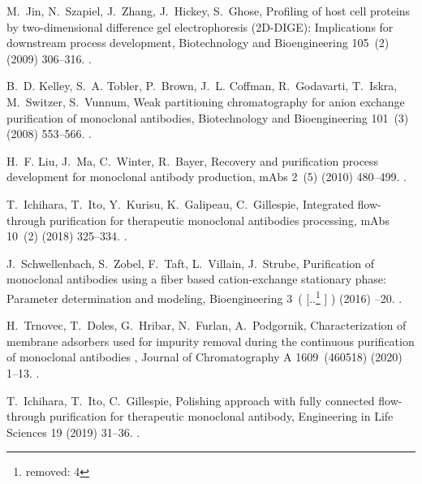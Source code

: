 \documentclass[preprint,review,12pt]{elsarticle}
\providecommand{\DIFaddtex}[1]{{\protect\color{blue} \sf #1}} %
\providecommand{\DIFdeltex}[1]{{\protect\color{red} [..\footnote{removed: #1} ]}} %
\providecommand{\DIFaddbegin}{} %
\providecommand{\DIFaddend}{} %
\providecommand{\DIFdelbegin}{} %
\providecommand{\DIFdelend}{} %
\providecommand{\DIFadd}[1]{\texorpdfstring{\DIFaddtex{#1}}{#1}} %
\providecommand{\DIFdel}[1]{\texorpdfstring{\DIFdeltex{#1}}{}} %
\begin{document}
\begin{thebibliography}{10}
M.~Jin, N.~Szapiel, J.~Zhang, J.~Hickey, S.~Ghose, {Profiling of host cell
  proteins by two-dimensional difference gel electrophoresis (2D-DIGE):
  Implications for downstream process development}, Biotechnology and
  Bioengineering 105~(2) (2009) 306--316.
\newblock \href {https://doi.org/10.1002/bit.22532}
  {}.

B.~D. Kelley, S.~A. Tobler, P.~Brown, J.~L. Coffman, R.~Godavarti, T.~Iskra,
  M.~Switzer, S.~Vunnum, {Weak partitioning chromatography for anion exchange
  purification of monoclonal antibodies}, Biotechnology and Bioengineering
  101~(3) (2008) 553--566.
\newblock \href {https://doi.org/10.1002/bit.21923}
  {}.

H.~F. Liu, J.~Ma, C.~Winter, R.~Bayer, {Recovery and purification process
  development for monoclonal antibody production}, mAbs 2~(5) (2010) 480--499.
\newblock \href {https://doi.org/10.4161/mabs.2.5.12645}
  {}.

T.~Ichihara, T.~Ito, Y.~Kurisu, K.~Galipeau, C.~Gillespie, {Integrated
  flow-through purification for therapeutic monoclonal antibodies processing},
  mAbs 10~(2) (2018) 325--334.
\newblock \href {https://doi.org/10.1080/19420862.2017.1417717}
  {}.

J.~Schwellenbach, S.~Zobel, F.~Taft, L.~Villain, J.~Strube, {Purification of
  monoclonal antibodies using a fiber based cation-exchange stationary phase:
  Parameter determination and modeling}, Bioengineering 3~(\DIFdelbegin \DIFdel{4}\DIFdelend \DIFaddbegin \DIFadd{24}\DIFaddend ) (2016) \DIFaddbegin \DIFadd{1--20}\DIFaddend .
\newblock \href {https://doi.org/10.3390/bioengineering3040024}
  {}.

\DIFaddbegin {}
\DIFadd{H.~Trnovec, T.~Doles, G.~Hribar, N.~Furlan, A.~Podgornik, }{\DIFadd{Characterization of
  membrane adsorbers used for impurity removal during the continuous
  purification of monoclonal antibodies}}\DIFadd{, Journal of Chromatography A
  1609~(460518) (2020) 1--13.
}\newblock \href {https://doi.org/10.1016/j.chroma.2019.460518}
  {}\DIFadd{.
}

\DIFaddend {}
T.~Ichihara, T.~Ito, C.~Gillespie, {Polishing approach with fully connected
  flow-through purification for therapeutic monoclonal antibody}, Engineering
  in Life Sciences 19 (2019) 31--36.
\newblock \href {https://doi.org/10.1002/elsc.201800123}
  {}.


\end{thebibliography}
\end{document}
